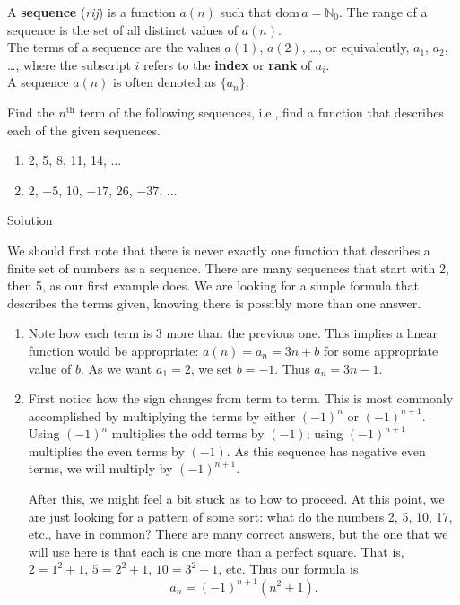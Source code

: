 \begin{definition}[Sequence]\label{def:sequence}
A \textbf{sequence} (\textit{rij}) is a function $a(n)$ such that $\text{dom}\, a=\mathbb{N}_0$. The range of a sequence is the set of all distinct values of $a(n)$.\\
The terms of a sequence are the values $a(1)$, $a(2)$, \ldots, or equivalently, $a_1$, $a_2$, \ldots, where the subscript $i$ refers to the \textbf{index} or \textbf{rank} of $a_i$.\\
A sequence $a(n)$ is often denoted as $\{a_n\}$.
\end{definition}


\begin{example}\label{ex_seq2}
Find the $n^\text{th}$ term of the following sequences, i.e., find a function that describes each of the given sequences.

\begin{multicols}{2}
\begin{enumerate}[align=left]
\item		2, 5, 8, 11, 14, $\ldots$
\item		2, $-5$, 10, $-17$, 26, $-37$, $\ldots$
\end{enumerate}
\end{multicols}


Solution 

We should first note that there is never exactly one function that describes a finite set of numbers as a sequence. There are many sequences that start with 2, then 5, as our first example does. We are looking for a simple formula that describes the terms given, knowing there is possibly more than one answer.
\begin{enumerate}[align=left]
\item		Note how each term is 3 more than the previous one. This implies a linear function would be appropriate: $a(n) = a_n = 3n + b$ for some appropriate value of $b$. As we want $a_1=2$, we set $b=-1$. Thus $a_n = 3n-1$.

\item		First notice how the sign changes from term to term. This is most commonly accomplished by multiplying the terms by either $(-1)^n$ or $(-1)^{n+1}$. Using $(-1)^n$ multiplies the odd terms by $(-1)$; using $(-1)^{n+1}$ multiplies the even terms by $(-1)$. As this sequence has negative even terms, we will multiply by $(-1)^{n+1}$. 

After this, we might feel a bit stuck as to how to proceed. At this point, we are just looking for a pattern of some sort: what do the numbers 2, 5, 10, 17, etc., have in common? There are many correct answers, but the one that we will use here is that each is one more than a perfect square. That is, $2=1^2+1$, $5=2^2+1$, $10=3^2+1$, etc. Thus our formula is $$a_n= (-1)^{n+1}(n^2+1).$$
\end{enumerate}
\end{example}


